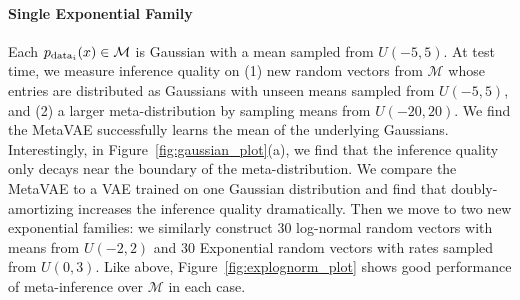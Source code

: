 \paragraph{Single Exponential Family}
Each $p_{\textup{data}_i}(x) \in \mathcal{M}$ is Gaussian with a mean sampled from $U(-5, 5)$.  At test time, we measure inference quality on (1) new random vectors from $\mathcal{M}$ whose entries are distributed as Gaussians with unseen means sampled from $U(-5, 5)$, and (2) a larger meta-distribution by sampling means from $U(-20, 20)$. We find the MetaVAE successfully learns the mean of the underlying Gaussians. Interestingly, in Figure~\ref{fig:gaussian_plot}(a), we find that the inference quality only decays near the boundary of the meta-distribution.
We compare the MetaVAE to a VAE trained on one Gaussian distribution and find that doubly-amortizing increases the inference quality dramatically.
Then we move to two new exponential families: we similarly construct 30 log-normal random vectors with means from $U(-2, 2)$ and 30 Exponential random vectors with rates sampled from $U(0, 3)$. Like above, Figure~\ref{fig:explognorm_plot} shows good performance of meta-inference over $\mathcal{M}$ in each case.

